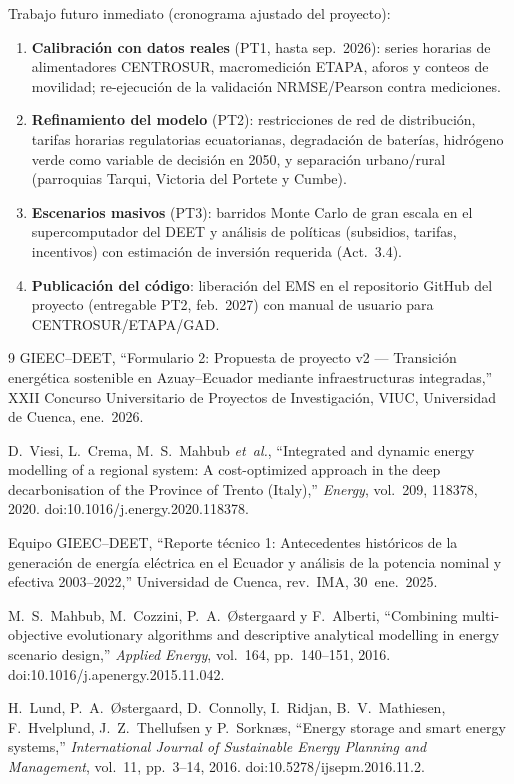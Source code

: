 \documentclass[11pt,a4paper]{article}
\begin{document}
Trabajo futuro inmediato (cronograma ajustado del proyecto):
\begin{enumerate}[leftmargin=1.6em]
  \item \textbf{Calibraci\'on con datos reales} (PT1, hasta sep.~2026): series horarias
  de alimentadores CENTROSUR, macromedici\'on ETAPA, aforos y conteos de movilidad;
  re-ejecuci\'on de la validaci\'on NRMSE/Pearson contra mediciones.
  \item \textbf{Refinamiento del modelo} (PT2): restricciones de red de distribuci\'on,
  tarifas horarias regulatorias ecuatorianas, degradaci\'on de bater\'ias, hidr\'ogeno
  verde como variable de decisi\'on en 2050, y separaci\'on urbano/rural
  (parroquias Tarqui, Victoria del Portete y Cumbe).
  \item \textbf{Escenarios masivos} (PT3): barridos Monte Carlo de gran escala en el
  supercomputador del DEET y an\'alisis de pol\'iticas (subsidios, tarifas, incentivos)
  con estimaci\'on de inversi\'on requerida (Act.~3.4).
  \item \textbf{Publicaci\'on del c\'odigo}: liberaci\'on del EMS en el repositorio
  GitHub del proyecto (entregable PT2, feb.~2027) con manual de usuario para
  CENTROSUR/ETAPA/GAD.
\end{enumerate}

\begin{thebibliography}{9}
 GIEEC--DEET, ``Formulario 2: Propuesta de proyecto v2 ---
Transici\'on energ\'etica sostenible en Azuay--Ecuador mediante infraestructuras
integradas,'' XXII Concurso Universitario de Proyectos de Investigaci\'on, VIUC,
Universidad de Cuenca, ene.~2026.

 D.~Viesi, L.~Crema, M.~S.~Mahbub \emph{et~al.}, ``Integrated and
dynamic energy modelling of a regional system: A cost-optimized approach in the deep
decarbonisation of the Province of Trento (Italy),'' \emph{Energy}, vol.~209, 118378,
2020. doi:10.1016/j.energy.2020.118378.

 Equipo GIEEC--DEET, ``Reporte t\'ecnico 1: Antecedentes
hist\'oricos de la generaci\'on de energ\'ia el\'ectrica en el Ecuador y an\'alisis de la
potencia nominal y efectiva 2003--2022,'' Universidad de Cuenca, rev.\ IMA,
30~ene.~2025.

 M.~S.~Mahbub, M.~Cozzini, P.~A.~{\O}stergaard y F.~Alberti,
``Combining multi-objective evolutionary algorithms and descriptive analytical
modelling in energy scenario design,'' \emph{Applied Energy}, vol.~164, pp.~140--151,
2016. doi:10.1016/j.apenergy.2015.11.042.

 H.~Lund, P.~A.~{\O}stergaard, D.~Connolly, I.~Ridjan, B.~V.~Mathiesen,
F.~Hvelplund, J.~Z.~Thellufsen y P.~Sorkn{\ae}s, ``Energy storage and smart energy
systems,'' \emph{International Journal of Sustainable Energy Planning and Management},
vol.~11, pp.~3--14, 2016. doi:10.5278/ijsepm.2016.11.2.
\end{thebibliography}
\end{document}
